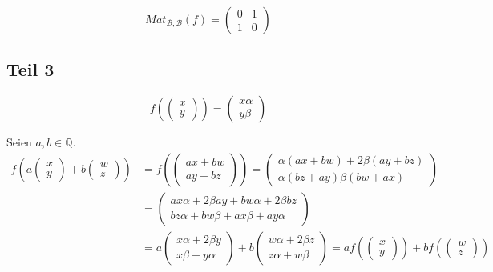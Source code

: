 \documentclass[a4paper,10pt]{article}
\begin{document}
\begin{equation}
 Mat_{\mathcal{B}, \mathcal{B}}(f) = \begin{pmatrix}
                                      0 & 1\\
                                      1 & 0
                                     \end{pmatrix}
\end{equation}

\subsection*{Teil 3}

\begin{equation}
 f(\begin{pmatrix}x\\y\end{pmatrix}) = \begin{pmatrix}x\alpha\\y\beta\end{pmatrix}
\end{equation}

Seien $a, b \in \mathbb{Q}$.
\begin{align*}
 f(a\begin{pmatrix}x\\y\end{pmatrix} + b\begin{pmatrix}w\\z\end{pmatrix}) & = f(\begin{pmatrix}ax + bw\\ay + bz\end{pmatrix}) = \begin{pmatrix}\alpha(ax + bw) + 2\beta(ay + bz)\\\alpha(bz + ay) \beta(bw + ax)\end{pmatrix}\\
 & = \begin{pmatrix}ax\alpha + 2\beta ay + bw\alpha + 2\beta bz\\bz\alpha + bw\beta + ax\beta + ay\alpha\end{pmatrix}\\
 & = a\begin{pmatrix}x\alpha + 2\beta y\\x\beta + y\alpha\end{pmatrix} + b\begin{pmatrix}w\alpha + 2\beta z\\z\alpha + w\beta\end{pmatrix} = af(\begin{pmatrix}x\\y\end{pmatrix}) + bf(\begin{pmatrix}w\\z\end{pmatrix})
\end{align*}
\end{document}
